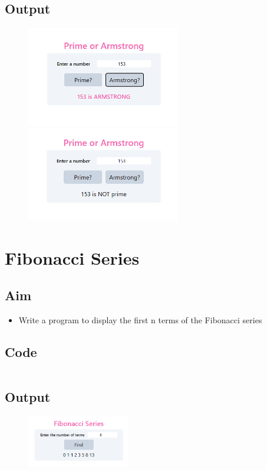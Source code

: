 \documentclass{article}
\begin{document}
\subsection{Output}
\begin{figure}[h!]
	\centering
	\includegraphics[width=0.6\textwidth]{./Assets/p0901.png}
	\includegraphics[width=0.6\textwidth]{./Assets/p0902.png}
\end{figure}
\newpage

\section{Fibonacci Series}
\subsection{Aim}
\begin{itemize}
	\item Write a program to display the first n terms of the Fibonacci series
\end{itemize}

\subsection{Code}
\inputminted[frame=lines, linenos, breaklines, breakanywhere, numberblanklines=false]{html}{./prog_10/index.html}

\subsection{Output}
\begin{figure}[h!]
	\centering
	\includegraphics[width=0.4\textwidth]{./Assets/p10.png}
\end{figure}
\newpage
\end{document}
